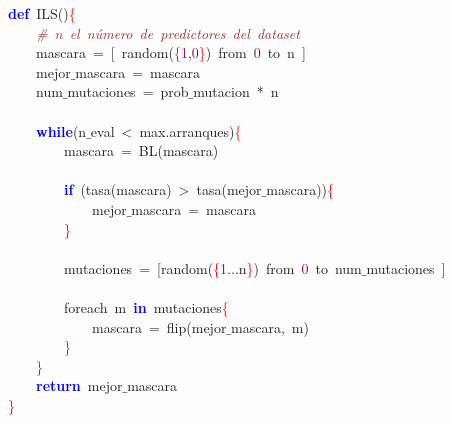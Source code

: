 \noindent
\mbox{}\textbf{\textcolor{Blue}{def}}\ ILS\textcolor{BrickRed}{()}\textcolor{Red}{\{} \\
\mbox{}\ \ \ \ \textit{\textcolor{Brown}{\#\ n\ el\ número\ de\ predictores\ del\ dataset}} \\
\mbox{}\ \ \ \ mascara\ \textcolor{BrickRed}{=}\ \textcolor{BrickRed}{[}\ random\textcolor{BrickRed}{(}\textcolor{Red}{\{}\textcolor{Purple}{1}\textcolor{BrickRed}{,}\textcolor{Purple}{0}\textcolor{Red}{\}}\textcolor{BrickRed}{)}\ from\ \textcolor{Purple}{0}\ to\ n\ \textcolor{BrickRed}{]} \\
\mbox{}\ \ \ \ mejor$\_$mascara\ \textcolor{BrickRed}{=}\ mascara \\
\mbox{}\ \ \ \ num$\_$mutaciones\ \textcolor{BrickRed}{=}\ prob$\_$mutacion\ \textcolor{BrickRed}{*}\ n \\
\mbox{} \\
\mbox{}\ \ \ \ \textbf{\textcolor{Blue}{while}}\textcolor{BrickRed}{(}n$\_$eval\ \textcolor{BrickRed}{\textless{}}\ max\textcolor{BrickRed}{.}arranques\textcolor{BrickRed}{)}\textcolor{Red}{\{} \\
\mbox{}\ \ \ \ \ \ \ \ mascara\ \textcolor{BrickRed}{=}\ BL\textcolor{BrickRed}{(}mascara\textcolor{BrickRed}{)} \\
\mbox{} \\
\mbox{}\ \ \ \ \ \ \ \ \textbf{\textcolor{Blue}{if}}\ \textcolor{BrickRed}{(}tasa\textcolor{BrickRed}{(}mascara\textcolor{BrickRed}{)}\ \textcolor{BrickRed}{\textgreater{}}\ tasa\textcolor{BrickRed}{(}mejor$\_$mascara\textcolor{BrickRed}{))}\textcolor{Red}{\{} \\
\mbox{}\ \ \ \ \ \ \ \ \ \ \ \ mejor$\_$mascara\ \textcolor{BrickRed}{=}\ mascara \\
\mbox{}\ \ \ \ \ \ \ \ \textcolor{Red}{\}} \\
\mbox{} \\
\mbox{}\ \ \ \ \ \ \ \ mutaciones\ \textcolor{BrickRed}{=}\ \textcolor{BrickRed}{[}random\textcolor{BrickRed}{(}\textcolor{Red}{\{}\textcolor{Purple}{1}\textcolor{BrickRed}{...}n\textcolor{Red}{\}}\textcolor{BrickRed}{)}\ from\ \textcolor{Purple}{0}\ to\ num$\_$mutaciones\ \textcolor{BrickRed}{]} \\
\mbox{} \\
\mbox{}\ \ \ \ \ \ \ \ foreach\ m\ \textbf{\textcolor{Blue}{in}}\ mutaciones\textcolor{Red}{\{} \\
\mbox{}\ \ \ \ \ \ \ \ \ \ \ \ mascara\ \textcolor{BrickRed}{=}\ flip\textcolor{BrickRed}{(}mejor$\_$mascara\textcolor{BrickRed}{,}\ m\textcolor{BrickRed}{)} \\
\mbox{}\ \ \ \ \ \ \ \ \textcolor{Red}{\}} \\
\mbox{}\ \ \ \ \textcolor{Red}{\}} \\
\mbox{}\ \ \ \ \textbf{\textcolor{Blue}{return}}\ mejor$\_$mascara \\
\mbox{}\textcolor{Red}{\}} \\
\mbox{}
